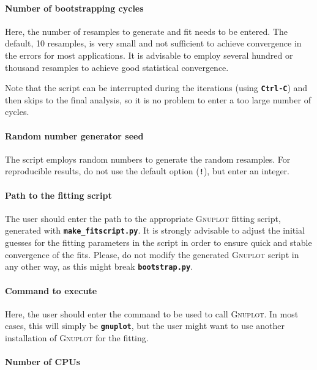 \documentclass[a4paper,10pt,DIV=15,openany,twoside=false]{scrbook}
\newcommand{\ttt}[1]{\textbf{\texttt{#1}}}
\begin{document}
\paragraph{Number of bootstrapping cycles}

Here, the number of resamples to generate and fit needs to be entered.
The default, 10 resamples, is very small and not sufficient to achieve convergence in the errors for most applications.
It is advisable to employ several hundred or thousand resamples to achieve good statistical convergence.

Note that the script can be interrupted during the iterations (using \ttt{Ctrl-C}) and then skips to the final analysis, so it is no problem to enter a too large number of cycles.

\paragraph{Random number generator seed}

The script employs random numbers to generate the random resamples.
For reproducible results, do not use the default option (\ttt{!}), but enter an integer.

\paragraph{Path to the fitting script}

The user should enter the path to the appropriate \textsc{Gnuplot} fitting script, generated with \ttt{make\_fitscript.py}.
It is strongly advisable to adjust the initial guesses for the fitting parameters in the script in order to ensure quick and stable convergence of the fits.
Please, do not modify the generated \textsc{Gnuplot} script in any other way, as this might break \ttt{bootstrap.py}.

\paragraph{Command to execute}

Here, the user should enter the command to be used to call \textsc{Gnuplot}. In most cases, this will simply be \ttt{gnuplot}, but the user might want to use another installation of \textsc{Gnuplot} for the fitting.

\paragraph{Number of CPUs}
\end{document}
